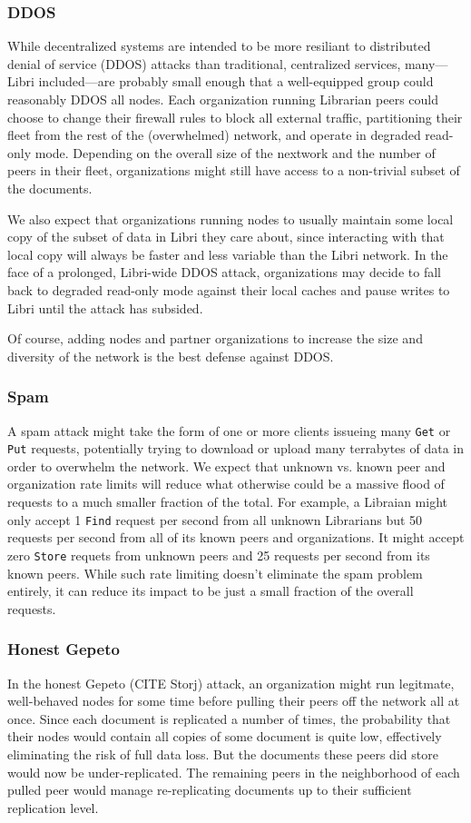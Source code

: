 \documentclass[10pt]{article}
\newcommand{\ttt}[1]{\texttt{#1}}
\def\Put{\ttt{Put}}
\def\Get{\ttt{Get}}
\begin{document}
\subsubsection{DDOS}
While decentralized systems are intended to be more resiliant to distributed denial of service (DDOS) attacks than traditional, centralized services, many---Libri included---are probably small enough that a well-equipped group could reasonably DDOS all nodes. Each organization running Librarian peers could choose to change their firewall rules to block all external traffic, partitioning their fleet from the rest of the (overwhelmed) network, and operate in degraded read-only mode. Depending on the overall size of the nextwork and the number of peers in their fleet, organizations might still have access to a non-trivial subset of the documents.

We also expect that organizations running nodes to usually maintain some local copy of the subset of data in Libri they care about, since interacting with that local copy will always be faster and less variable than the Libri network. In the face of a prolonged, Libri-wide DDOS attack, organizations may decide to fall back to degraded read-only mode against their local caches and pause writes to Libri until the attack has subsided.

Of course, adding nodes and partner organizations to increase the size and diversity of the network is the best defense against DDOS.

\subsubsection{Spam}
A spam attack might take the form of one or more clients issueing many \Get{} or \Put{} requests, potentially trying to download or upload many terrabytes of data in order to overwhelm the network. We expect that unknown vs. known peer and organization rate limits will reduce what otherwise could be a massive flood of requests to a much smaller fraction of the total. For example, a Libraian might only accept 1 \ttt{Find} request per second from all unknown Librarians but 50 requests per second from all of its known peers and organizations. It might accept zero \ttt{Store} requets from unknown peers and 25 requests per second from its known peers. While such rate limiting doesn't eliminate the spam problem entirely, it can reduce its impact to be just a small fraction of the overall requests.

\subsubsection{Honest Gepeto}
In the honest Gepeto (CITE Storj) attack, an organization might run legitmate, well-behaved nodes for some time before pulling their peers off the network all at once. Since each document is replicated a number of times, the probability that their nodes would contain all copies of some document is quite low, effectively eliminating the risk of full data loss. But the documents these peers did store would now be under-replicated. The remaining peers in the neighborhood of each pulled peer would manage re-replicating documents up to their sufficient replication level.
\end{document}
